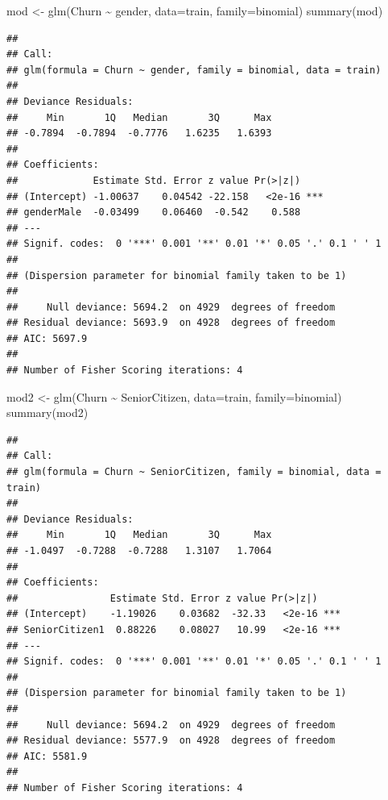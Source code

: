 \documentclass[
  twoside]{article}
\newenvironment{Shaded}{\begin{snugshade}}{\end{snugshade}}
\newcommand{\AttributeTok}[1]{\textcolor[rgb]{0.77,0.63,0.00}{#1}}
\newcommand{\FunctionTok}[1]{\textcolor[rgb]{0.00,0.00,0.00}{#1}}
\newcommand{\NormalTok}[1]{#1}
\newcommand{\OtherTok}[1]{\textcolor[rgb]{0.56,0.35,0.01}{#1}}
\newcommand{\SpecialCharTok}[1]{\textcolor[rgb]{0.00,0.00,0.00}{#1}}
\begin{document}
\begin{Shaded}
\begin{Highlighting}[]
\NormalTok{mod }\OtherTok{\textless{}{-}} \FunctionTok{glm}\NormalTok{(Churn }\SpecialCharTok{\textasciitilde{}}\NormalTok{ gender, }\AttributeTok{data=}\NormalTok{train, }\AttributeTok{family=}\NormalTok{binomial)}
\FunctionTok{summary}\NormalTok{(mod)}
\end{Highlighting}
\end{Shaded}

\begin{verbatim}
## 
## Call:
## glm(formula = Churn ~ gender, family = binomial, data = train)
## 
## Deviance Residuals: 
##     Min       1Q   Median       3Q      Max  
## -0.7894  -0.7894  -0.7776   1.6235   1.6393  
## 
## Coefficients:
##             Estimate Std. Error z value Pr(>|z|)    
## (Intercept) -1.00637    0.04542 -22.158   <2e-16 ***
## genderMale  -0.03499    0.06460  -0.542    0.588    
## ---
## Signif. codes:  0 '***' 0.001 '**' 0.01 '*' 0.05 '.' 0.1 ' ' 1
## 
## (Dispersion parameter for binomial family taken to be 1)
## 
##     Null deviance: 5694.2  on 4929  degrees of freedom
## Residual deviance: 5693.9  on 4928  degrees of freedom
## AIC: 5697.9
## 
## Number of Fisher Scoring iterations: 4
\end{verbatim}

\begin{Shaded}
\begin{Highlighting}[]
\NormalTok{mod2 }\OtherTok{\textless{}{-}} \FunctionTok{glm}\NormalTok{(Churn }\SpecialCharTok{\textasciitilde{}}\NormalTok{ SeniorCitizen, }\AttributeTok{data=}\NormalTok{train, }\AttributeTok{family=}\NormalTok{binomial)}
\FunctionTok{summary}\NormalTok{(mod2)}
\end{Highlighting}
\end{Shaded}

\begin{verbatim}
## 
## Call:
## glm(formula = Churn ~ SeniorCitizen, family = binomial, data = train)
## 
## Deviance Residuals: 
##     Min       1Q   Median       3Q      Max  
## -1.0497  -0.7288  -0.7288   1.3107   1.7064  
## 
## Coefficients:
##                Estimate Std. Error z value Pr(>|z|)    
## (Intercept)    -1.19026    0.03682  -32.33   <2e-16 ***
## SeniorCitizen1  0.88226    0.08027   10.99   <2e-16 ***
## ---
## Signif. codes:  0 '***' 0.001 '**' 0.01 '*' 0.05 '.' 0.1 ' ' 1
## 
## (Dispersion parameter for binomial family taken to be 1)
## 
##     Null deviance: 5694.2  on 4929  degrees of freedom
## Residual deviance: 5577.9  on 4928  degrees of freedom
## AIC: 5581.9
## 
## Number of Fisher Scoring iterations: 4
\end{verbatim}
\end{document}
